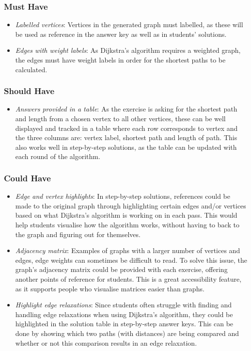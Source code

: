 \documentclass{l4proj}
\begin{document}
\subsubsection{Must Have}
\begin{itemize}
	\item
	\emph{Labelled vertices}: Vertices in the generated graph must labelled, as these will be used as reference in the answer key as well as in students' solutions. 
	\item
	\emph{Edges with weight labels}: As Dijkstra's algorithm requires a weighted graph, the edges must have weight labels in order for the shortest paths to be calculated.
\end{itemize}
\subsubsection{Should Have}
\begin{itemize}
	\item
	\emph{Answers provided in a table}: As the exercise is asking for the shortest path and length from a chosen vertex to all other vertices, these can be well displayed and tracked in a table where each row corresponds to vertex and the three columns are: vertex label, shortest path and length of path. This also works well in step-by-step solutions, as the table can be updated with each round of the algorithm.
\end{itemize}
\subsubsection{Could Have}
\begin{itemize}
	\item
	\emph{Edge and vertex highlights}: In step-by-step solutions, references could be made to the original graph through highlighting certain edges and/or vertices based on what Dijkstra's algorithm is working on in each pass. This would help students visualise how the algorithm works, without having to back to the graph and figuring out for themselves.
	\item
	\emph{Adjacency matrix}: Examples of graphs with a larger number of vertices and edges, edge weights can sometimes be difficult to read. To solve this issue, the graph's adjacency matrix could be provided with each exercise, offering another points of reference for students. This is a great accessibility feature, as it supports people who visualise matrices easier than graphs.
	\item
	\emph{Highlight edge relaxations}: Since students often struggle with finding and handling edge relaxations \cite{} when using Dijkstra's algorithm, they could be highlighted in the solution table in step-by-step answer keys. This can be done by showing which two paths (with distances) are being compared and whether or not this comparison results in an edge relaxation.
\end{itemize}
\end{document}
